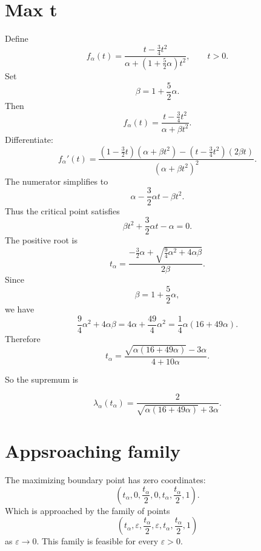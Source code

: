 \documentclass[11pt]{article}
\begin{document}
\section{Max t}

Define
\[
f_\alpha(t)
=
\frac{t-\frac34t^2}{\alpha+\left(1+\frac52\alpha\right)t^2},
\qquad t>0.
\]
Set
\[
\beta=1+\frac52\alpha.
\]
Then
\[
f_\alpha(t)=\frac{t-\frac34t^2}{\alpha+\beta t^2}.
\]
Differentiate:
\[
f_\alpha'(t)
=
\frac{
\left(1-\frac32t\right)(\alpha+\beta t^2)
-
\left(t-\frac34t^2\right)(2\beta t)
}{
(\alpha+\beta t^2)^2
}.
\]
The numerator simplifies to
\[
\alpha-\frac32\alpha t-\beta t^2.
\]
Thus the critical point satisfies
\[
\beta t^2+\frac32\alpha t-\alpha=0.
\]
The positive root is
\[
t_\alpha
=
\frac{
-\frac32\alpha+\sqrt{\frac94\alpha^2+4\alpha\beta}
}{
2\beta
}.
\]
Since
\[
\beta=1+\frac52\alpha,
\]
we have
\[
\frac94\alpha^2+4\alpha\beta
=
4\alpha+\frac{49}{4}\alpha^2
=
\frac14\alpha(16+49\alpha).
\]
Therefore
\[
t_\alpha
=
\frac{\sqrt{\alpha(16+49\alpha)}-3\alpha}{4+10\alpha}.
\]

So the supremum is

\[
\lambda_\alpha(t_\alpha)
=
\frac{2}{\sqrt{\alpha(16+49\alpha)}+3\alpha}.
\]


\section{Appsroaching family}

The maximizing boundary point has zero coordinates:
\[
\left(
t_\alpha,0,\frac{t_\alpha}{2},0,t_\alpha,\frac{t_\alpha}{2},1
\right).
\]
Which is approached by the family of points
\[
\left(
t_\alpha,\varepsilon,\frac{t_\alpha}{2},
\varepsilon,t_\alpha,\frac{t_\alpha}{2},1
\right)
\]
as \(\varepsilon\to0\).  This family is feasible for every \(\varepsilon>0\).
\end{document}
